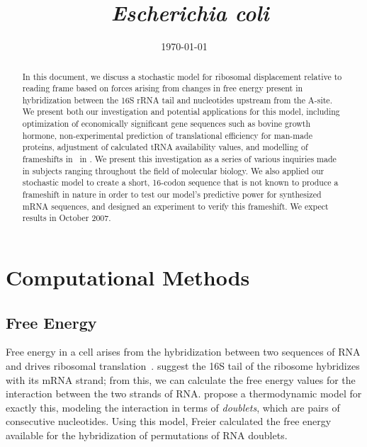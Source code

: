 \documentclass[12pt, draft]{article}
\author{\sc{\BWFauthors}}
\date{{\sc \today}}
\title{\bf{\BWFtitle~\emph{Escherichia coli}}}
\numberwithin{equation}{section}
\begin{document}
\begin{singlespace}
  \maketitle
  \tableofcontents
\end{singlespace}

\clearpage
\begin{abstract}\begin{normalsize}
  In this document, we discuss a stochastic model for ribosomal displacement relative to reading 
  frame based on forces arising from changes in free energy present in hybridization between the 
  16S rRNA tail and nucleotides upstream from the A-site.  We present both our investigation and 
  potential applications for this model, including optimization of economically significant gene
  sequences such as bovine growth hormone, non-experimental prediction of translational efficiency for man-made 
  proteins, adjustment of calculated tRNA availability values, and modelling of frameshifts in \prfB\ in \ecoli.
  We present this investigation as a series of various inquiries made 
  in subjects ranging throughout the field of molecular biology.  We also applied our stochastic 
  model to create a short, 16-codon sequence that is not known to produce a frameshift in nature 
  in order to test our model's predictive power for synthesized mRNA sequences, and designed an 
  experiment to verify this frameshift.  We expect results in October 2007.
\end{normalsize}\end{abstract}
\clearpage
{}

\section{Computational Methods}
\subsection{Free Energy}
\label{freeenergy}

Free energy in a cell arises from the hybridization between two
sequences of RNA and drives ribosomal translation~\cite{starmer}.
\citet{weiss88} suggest the 16S tail of the ribosome hybridizes with its mRNA strand;
from this, we can calculate the free energy values for the interaction between the two strands of RNA.
\citet{freier} propose a thermodynamic model for exactly this,
modeling the interaction in terms of \emph{doublets}, which are pairs of consecutive nucleotides.
Using this model, Freier calculated the free energy available
for the hybridization of permutations of RNA doublets.
\end{document}
